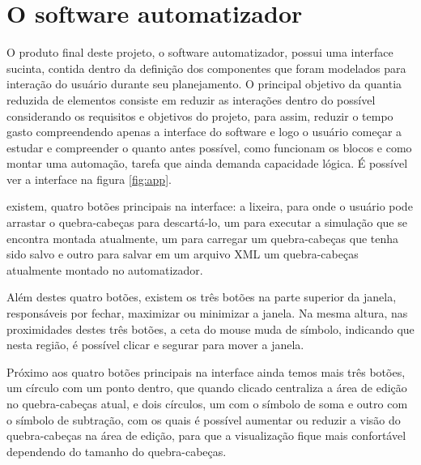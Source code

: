 \documentclass[tg]{mdtufsm}
\begin{document}
            \section {O software automatizador}

                O produto final deste projeto, o software automatizador, possui uma interface sucinta, contida dentro da definição dos componentes que foram modelados para interação do usuário durante seu planejamento. O principal objetivo da quantia reduzida de elementos consiste em reduzir as interações dentro do possível considerando os requisitos e objetivos do projeto, para assim, reduzir o tempo gasto compreendendo apenas a interface do software e logo o usuário começar a estudar e compreender o quanto antes possível, como funcionam os blocos e como montar uma automação, tarefa que ainda demanda capacidade lógica. É possível ver a interface na figura \ref{fig:app}.

                existem, quatro botões principais na interface: a lixeira, para onde o usuário pode arrastar o quebra-cabeças para descartá-lo, um para executar a simulação que se encontra montada atualmente, um para carregar um quebra-cabeças que tenha sido salvo e outro para salvar em um arquivo XML um quebra-cabeças atualmente montado no automatizador.

                Além destes quatro botões, existem os três botões na parte superior da janela, responsáveis por fechar, maximizar ou minimizar a janela. Na mesma altura, nas proximidades destes três botões, a ceta do mouse muda de símbolo, indicando que nesta região, é possível clicar e segurar para mover a janela.

                Próximo aos quatro botões principais na interface ainda temos mais três botões, um círculo com um ponto dentro, que quando clicado centraliza a área de edição no quebra-cabeças atual, e dois círculos, um com o símbolo de soma e outro com o símbolo de subtração, com os quais é possível aumentar ou reduzir a visão do quebra-cabeças na área de edição, para que a visualização fique mais confortável dependendo do tamanho do quebra-cabeças.
\end{document}
